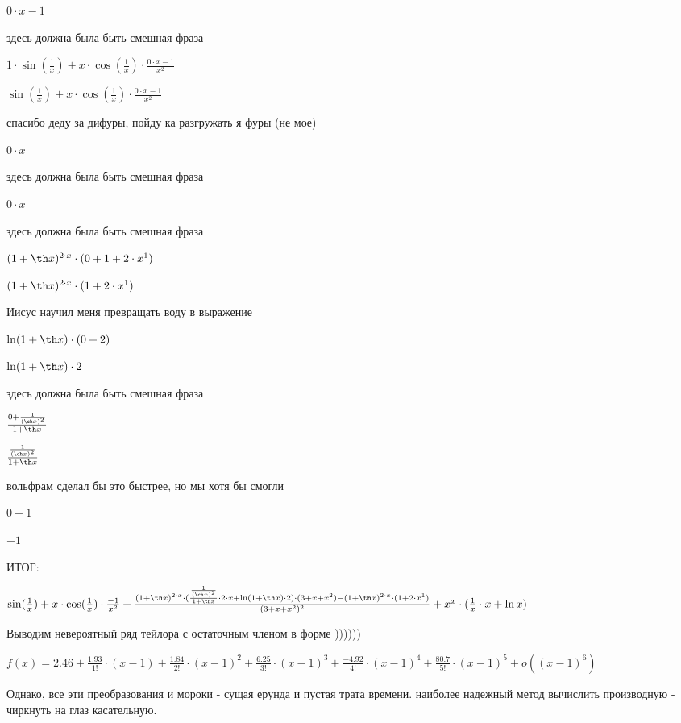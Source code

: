 \documentclass[a4paper,12pt]{article}
\begin{document}
$0 \cdot x-1$

здесь должна была быть смешная фраза 

$1 \cdot  \sin ( \frac{1}{x} )+x \cdot  \cos ( \frac{1}{x} ) \cdot  \frac{0 \cdot x-1}{x^{2}} $

$ \sin ( \frac{1}{x} )+x \cdot  \cos ( \frac{1}{x} ) \cdot  \frac{0 \cdot x-1}{x^{2}} $

спасибо деду за дифуры, пойду ка разгружать я фуры (не мое) 

$0 \cdot x$

здесь должна была быть смешная фраза 

$0 \cdot x$

здесь должна была быть смешная фраза 

$(1+ \th x)^{2 \cdot x} \cdot (0+1+2 \cdot x^{1})$

$(1+ \th x)^{2 \cdot x} \cdot (1+2 \cdot x^{1})$

Иисус научил меня превращать воду в выражение 

$ \ln (1+ \th x) \cdot (0+2)$

$ \ln (1+ \th x) \cdot 2$

здесь должна была быть смешная фраза 

$ \frac{0+ \frac{1}{( \ch x)^{2}} }{1+ \th x} $

$ \frac{ \frac{1}{( \ch x)^{2}} }{1+ \th x} $

вольфрам сделал бы это быстрее, но мы хотя бы смогли 

$0-1$

$-1$

ИТОГ:

$ \sin ( \frac{1}{x} )+x \cdot  \cos ( \frac{1}{x} ) \cdot  \frac{-1}{x^{2}} + \frac{(1+ \th x)^{2 \cdot x} \cdot ( \frac{ \frac{1}{( \ch x)^{2}} }{1+ \th x}  \cdot 2 \cdot x+ \ln (1+ \th x) \cdot 2) \cdot (3+x+x^{2})-(1+ \th x)^{2 \cdot x} \cdot (1+2 \cdot x^{1})}{(3+x+x^{2})^{2}} +x^{x} \cdot ( \frac{1}{x}  \cdot x+ \ln x)$



Выводим невероятный ряд тейлора с остаточным членом в форме ))))))

$f(x) = 2.46 + \frac{1.93}{1!} \cdot (x - 1) + \frac{1.84}{2!} \cdot (x - 1)^{2} + \frac{6.25}{3!} \cdot (x - 1)^{3} + \frac{-4.92}{4!} \cdot (x - 1)^{4} + \frac{80.7}{5!} \cdot (x - 1)^{5} + o((x - 1)^{6})$

Однако, все эти преобразования и мороки - сущая ерунда и пустая трата времени. наиболее надежный метод вычислить производную - чиркнуть на глаз касательную.
\end{document}
